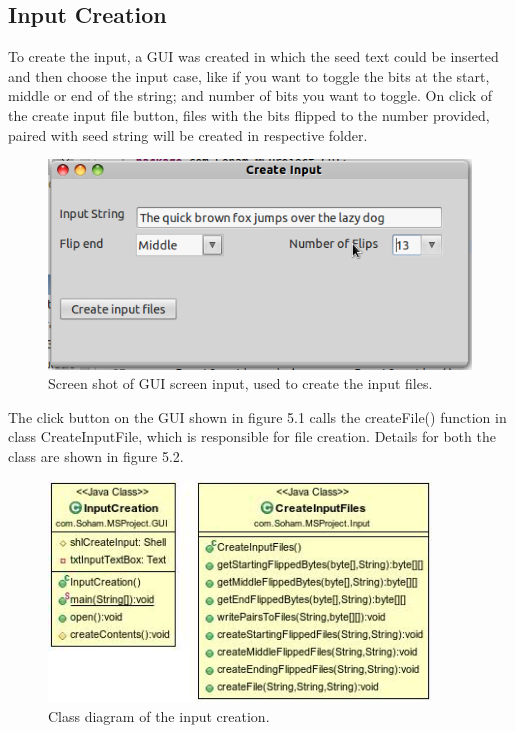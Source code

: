 \subsection{Input Creation}

To create the input, a GUI was created in which the seed text could be inserted and then choose the input case,
like if you want to toggle the bits at the start, middle or end of the string; and number of bits you want
to toggle. On click of the create input file button, files with the bits flipped to the number provided, paired
with seed string will be created in respective folder.

\begin{figure}
  \begin{center}
    \includegraphics[width=5.2in]{inputcreationscreenshot.png}
  \end{center}
  \caption{Screen shot of GUI screen input, used to create the input files.}
  \label{fig:screenshotinputcreation}
\end{figure}

The click button on the GUI shown in figure 5.1 calls the createFile() function in class CreateInputFile, which 
is responsible for file creation. Details for both the class are shown in figure 5.2.

\begin{figure}
  \begin{center}
    \includegraphics[width=4in]{Input.jpg}
  \end{center}
  \caption{Class diagram of the input creation.}
  \label{fig:UMLInputCreation}
\end{figure}

